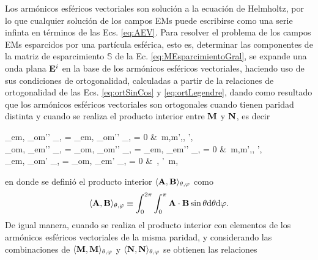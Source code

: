 Los armónicos esféricos vectoriales son solución a la ecuación de Helmholtz, por lo que cualquier solución de los campos EMs puede escribirse como una serie infinta en términos de las Ecs. \eqref{eq:AEV}. Para resolver el problema de los campos EMs esparcidos por una partícula esférica, esto es, determinar las componentes de la matriz de esparcimiento $\mathbb{S}$ de la Ec. \eqref{eq:MEsparcimientoGral}, se expande una onda plana $\vb{E}^i$ en la base de los armónicos esféricos vectoriales, haciendo uso de sus condiciones de ortogonalidad, calculadas a partir de la relaciones de ortogonalidad de las Ecs. \eqref{eq:ortSinCos} y \eqref{eq:ortLegendre}, dando como resultado que los armónicos esféricos vectoriales son ortogonales cuando tienen paridad distinta y cuando se realiza el producto interior entre $\vb{M}$ y $\vb{N}$, es decir 
%
	\begin{tcolorbox}
		\langle{}_{em\ell}, _{om'\ell'} \rangle_{\theta,\varphi} =
		\langle{}_{em\ell}, _{om'\ell'} \rangle_{\theta,\varphi} = 0
		&\qquad \forall\,  m,m',\ell, \ell',\\
		\langle{}_{om\ell}, _{em'\ell'} \rangle_{\theta,\varphi} = 
		\langle{}_{om\ell}, _{om'\ell'} \rangle_{\theta,\varphi} = 	
		\langle{}_{em\ell}, _{em'\ell'} \rangle_{\theta,\varphi} = 0
		&\qquad \forall\,  m,m',\ell, \ell',	\\
		\langle{}_{em\ell},  _{om\ell'} \rangle_{\theta,\varphi} =
		\langle{}_{om\ell},  _{em\ell'} \rangle_{\theta,\varphi} = 0	
		&\qquad \forall\, \ell, \ell'\, m,
	\end{tcolorbox}\noindent
en donde se definió el producto interior $\langle \vb{A},\vb{B} \rangle_{\theta,\varphi}$ como 
	\begin{align*}
	\langle \vb{A},\vb{B} \rangle_{\theta,\varphi} 
	\equiv 
	\int_0^{2\pi}\int_0^\pi \vb{A}\cdot\vb{B} \sin\theta \dd\theta \dd\varphi.
	\end{align*}
De igual manera, cuando se realiza el producto interior con elementos de los armónicos esféricos vectoriales de la misma paridad, y considerando las combinaciones de  $\langle \vb{M},\vb{M}\rangle_{\theta,\varphi}$ y $\langle \vb{N},\vb{N}\rangle_{\theta,\varphi}$  se obtienen las relaciones \vspace{-.5em}
